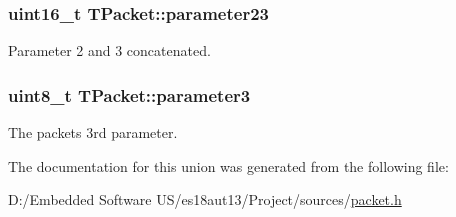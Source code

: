 \subsubsection[{parameter23}]{\setlength{\rightskip}{0pt plus 5cm}uint16\+\_\+t T\+Packet\+::parameter23}\label{union_t_packet_a92905f7e01f01bd1439dc4668b6808c1}
Parameter 2 and 3 concatenated. \hypertarget{union_t_packet_ab3ac2f9a6cfe5b6a7ae0987d21de472b}{}
\subsubsection[{parameter3}]{\setlength{\rightskip}{0pt plus 5cm}uint8\+\_\+t T\+Packet\+::parameter3}\label{union_t_packet_ab3ac2f9a6cfe5b6a7ae0987d21de472b}
The packet\textquotesingle{}s 3rd parameter. 

The documentation for this union was generated from the following file\+:\begin{DoxyCompactItemize}
\item 
D\+:/\+Embedded Software U\+S/es18aut13/\+Project/sources/\hyperlink{packet_8h}{packet.\+h}\end{DoxyCompactItemize}
